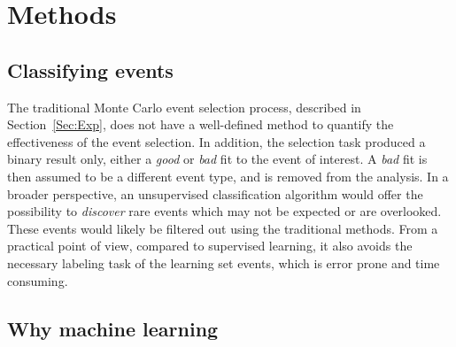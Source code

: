 \documentclass[review,sort&compress]{elsarticle}
\begin{document}
\section{Methods}\label{sec:methods}

\subsection{Classifying  events} 
The traditional Monte Carlo event selection process, described in Section~\ref{Sec:Exp}, does not have a well-defined method to quantify the effectiveness of the event selection.
In addition, the selection task produced a binary result only, either a {\em good} or {\em bad} fit to the event of interest. A {\em bad} fit is then assumed to be a different event type, and is removed from the analysis. %
In a broader perspective, an unsupervised classification algorithm would offer the possibility to {\em discover} rare events which may not be expected or are overlooked. These events would likely be filtered out using the traditional methods. From a practical point of view, compared to supervised learning, it also avoids the necessary labeling task of the learning set events, which is error prone and time consuming.

\subsection{Why machine learning}
\end{document}

